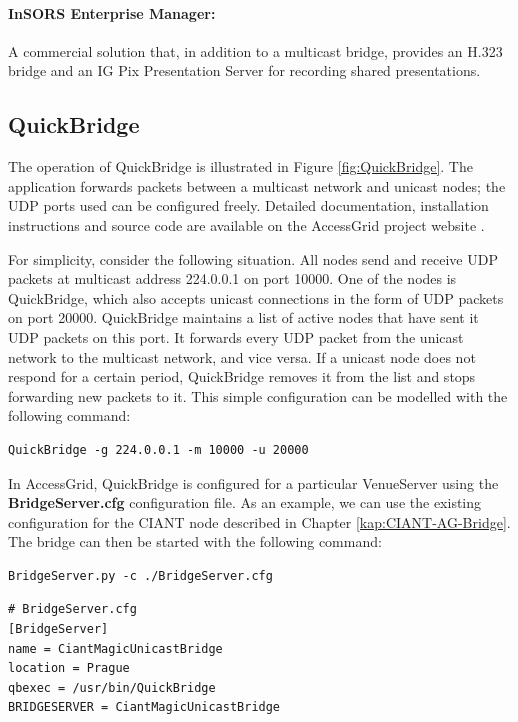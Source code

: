 \paragraph*{InSORS Enterprise Manager:}
A commercial solution that, in addition to a multicast bridge, provides an H.323 bridge and an IG Pix Presentation Server for recording shared presentations.


\subsection{QuickBridge}

The operation of QuickBridge is illustrated in Figure \ref{fig:QuickBridge}. The application forwards packets between a multicast network and unicast nodes; the UDP ports used can be configured freely. Detailed documentation, installation instructions and source code are available on the AccessGrid project website \cite{AG-BridgingGuide}.

For simplicity, consider the following situation. All nodes send and receive UDP packets at multicast address 224.0.0.1 on port 10000. One of the nodes is QuickBridge, which also accepts unicast connections in the form of UDP packets on port 20000. QuickBridge maintains a list of active nodes that have sent it UDP packets on this port. It forwards every UDP packet from the unicast network to the multicast network, and vice versa. If a unicast node does not respond for a certain period, QuickBridge removes it from the list and stops forwarding new packets to it. This simple configuration can be modelled with the following command:
\begin{verbatim}
QuickBridge -g 224.0.0.1 -m 10000 -u 20000
\end{verbatim}

In AccessGrid, QuickBridge is configured for a particular VenueServer using the \textbf{BridgeServer.cfg} configuration file. As an example, we can use the existing configuration for the CIANT node described in Chapter \ref{kap:CIANT-AG-Bridge}. The bridge can then be started with the following command:
\begin{verbatim}
BridgeServer.py -c ./BridgeServer.cfg
\end{verbatim}

\begin{verbatim}
# BridgeServer.cfg
[BridgeServer]
name = CiantMagicUnicastBridge
location = Prague
qbexec = /usr/bin/QuickBridge
BRIDGESERVER = CiantMagicUnicastBridge
\end{verbatim}

